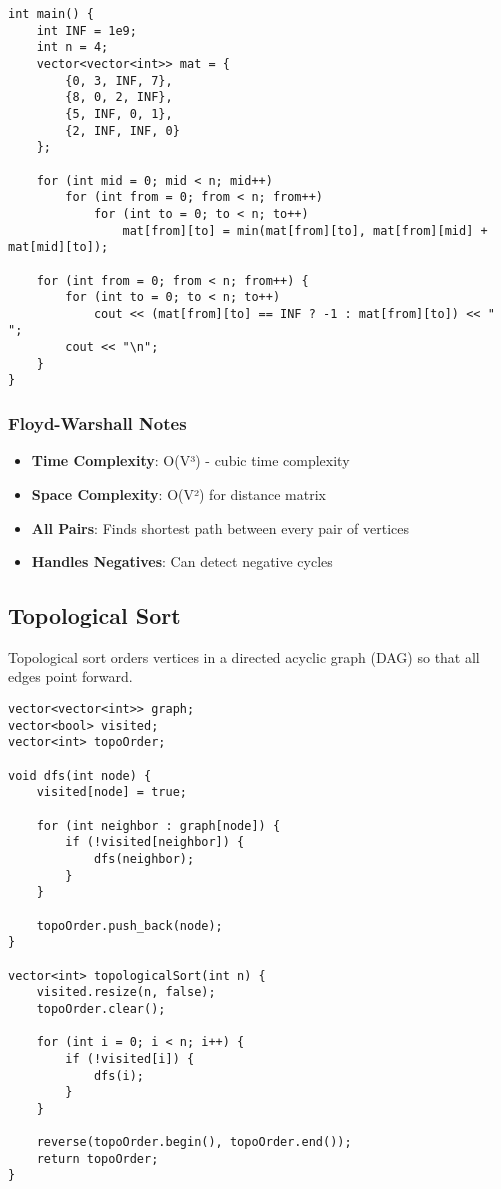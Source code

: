 \documentclass[11pt,a4paper]{article}
\begin{document}
\begin{lstlisting}[caption={Floyd-Warshall Algorithm}]
int main() {
    int INF = 1e9;
    int n = 4;
    vector<vector<int>> mat = {
        {0, 3, INF, 7},
        {8, 0, 2, INF},
        {5, INF, 0, 1},
        {2, INF, INF, 0}
    };

    for (int mid = 0; mid < n; mid++)
        for (int from = 0; from < n; from++)
            for (int to = 0; to < n; to++)
                mat[from][to] = min(mat[from][to], mat[from][mid] + mat[mid][to]);

    for (int from = 0; from < n; from++) {
        for (int to = 0; to < n; to++)
            cout << (mat[from][to] == INF ? -1 : mat[from][to]) << " ";
        cout << "\n";
    }
}
\end{lstlisting}

\subsubsection{Floyd-Warshall Notes}
\begin{itemize}
\item \textbf{Time Complexity}: O(V³) - cubic time complexity
\item \textbf{Space Complexity}: O(V²) for distance matrix
\item \textbf{All Pairs}: Finds shortest path between every pair of vertices
\item \textbf{Handles Negatives}: Can detect negative cycles
\end{itemize}

\newpage
\subsection{Topological Sort}
Topological sort orders vertices in a directed acyclic graph (DAG) so that all edges point forward.

\begin{lstlisting}[caption={Topological Sort with DFS}]
vector<vector<int>> graph;
vector<bool> visited;
vector<int> topoOrder;

void dfs(int node) {
    visited[node] = true;
    
    for (int neighbor : graph[node]) {
        if (!visited[neighbor]) {
            dfs(neighbor);
        }
    }
    
    topoOrder.push_back(node);
}

vector<int> topologicalSort(int n) {
    visited.resize(n, false);
    topoOrder.clear();
    
    for (int i = 0; i < n; i++) {
        if (!visited[i]) {
            dfs(i);
        }
    }
    
    reverse(topoOrder.begin(), topoOrder.end());
    return topoOrder;
}
\end{lstlisting}
\end{document}
